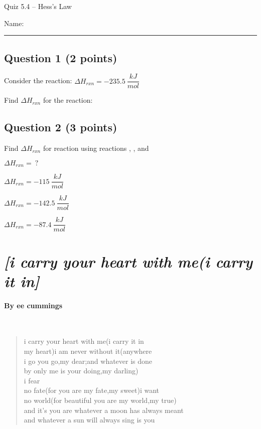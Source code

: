 \documentclass[11pt, letterpaper]{memoir}
\begin{document}
	\begin{center}
		{\large	Quiz 5.4 -- Hess's Law}
	\end{center}
{\large Name: \rule[-1mm]{4in}{.1pt}
	
	\subsection*{Question 1 (2 points)}
	Consider the reaction:  \hspace{1.5em} $\Delta H_{rxn} = -235.5~\dfrac{kJ}{mol}$
	
	\noindent
	Find $\Delta H_{rxn}$ for the reaction: 
	

	\vspace{6em}
	\subsection*{Question 2 (3 points)}
	Find $\Delta H_{rxn}$ for reaction \circled{$\star$} using reactions , , and 
	
	\circled{$\star$}  \hspace{1.5em} $\Delta H_{rxn} = ~?$
	
	  \hspace{1.5em} $\Delta H_{rxn} = -115~\dfrac{kJ}{mol}$
	
	  \hspace{1.5em} $\Delta H_{rxn} = -142.5~\dfrac{kJ}{mol}$
	
	  \hspace{1.5em} $\Delta H_{rxn} = -87.4~\dfrac{kJ}{mol}$
	
	
\newpage
\pagestyle{empty}
\addtocounter{page}{-1}
\newpage
\section*{\emph{[i carry your heart with me(i carry it in]}}
\paragraph{By ee cummings}~
\begin{verse}
	i carry your heart with me(i carry it in\\
	my heart)i am never without it(anywhere\\
	i go you go,my dear;and whatever is done\\
	by only me is your doing,my darling)\\
	\hspace{14em} i fear\\
	no fate(for you are my fate,my sweet)i want\\
	no world(for beautiful you are my world,my true)\\
	and it’s you are whatever a moon has always meant\\
	and whatever a sun will always sing is you


\end{verse}}
\end{document}
